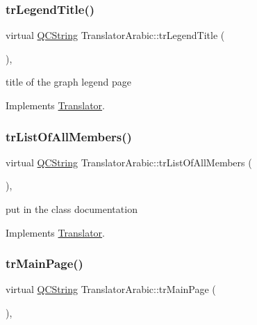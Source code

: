 \subsubsection{\texorpdfstring{trLegendTitle()}{trLegendTitle()}}
{\footnotesize\ttfamily virtual \mbox{\hyperlink{class_q_c_string}{Q\+C\+String}} Translator\+Arabic\+::tr\+Legend\+Title (\begin{DoxyParamCaption}{ }\end{DoxyParamCaption})\hspace{0.3cm}{\ttfamily [inline]}, {\ttfamily [virtual]}}

title of the graph legend page 

Implements \mbox{\hyperlink{class_translator}{Translator}}.

\mbox{\label{class_translator_arabic_aa74afc0198ad562e0268e0c0f8ac112a}} 
\subsubsection{\texorpdfstring{trListOfAllMembers()}{trListOfAllMembers()}}
{\footnotesize\ttfamily virtual \mbox{\hyperlink{class_q_c_string}{Q\+C\+String}} Translator\+Arabic\+::tr\+List\+Of\+All\+Members (\begin{DoxyParamCaption}{ }\end{DoxyParamCaption})\hspace{0.3cm}{\ttfamily [inline]}, {\ttfamily [virtual]}}

put in the class documentation 

Implements \mbox{\hyperlink{class_translator}{Translator}}.

\mbox{\label{class_translator_arabic_a593eb2a9c452c8e2eb1c59b39cd9ddb7}} 
\subsubsection{\texorpdfstring{trMainPage()}{trMainPage()}}
{\footnotesize\ttfamily virtual \mbox{\hyperlink{class_q_c_string}{Q\+C\+String}} Translator\+Arabic\+::tr\+Main\+Page (\begin{DoxyParamCaption}{ }\end{DoxyParamCaption})\hspace{0.3cm}{\ttfamily [inline]}, {\ttfamily [virtual]}}

